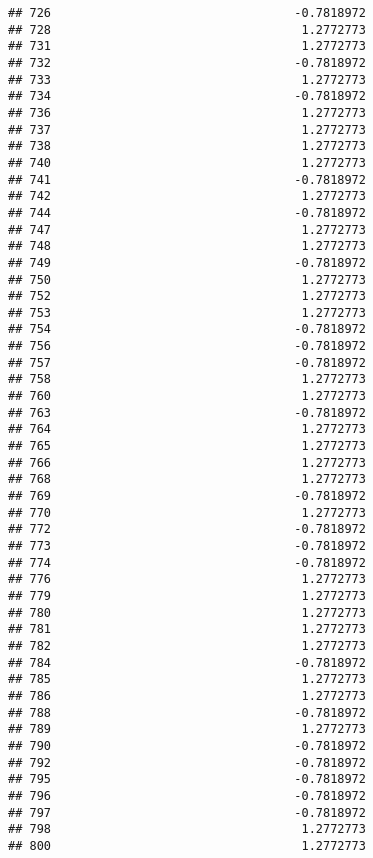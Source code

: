 \documentclass[
]{article}
\begin{document}
\begin{verbatim}
## 726                                  -0.7818972
## 728                                   1.2772773
## 731                                   1.2772773
## 732                                  -0.7818972
## 733                                   1.2772773
## 734                                  -0.7818972
## 736                                   1.2772773
## 737                                   1.2772773
## 738                                   1.2772773
## 740                                   1.2772773
## 741                                  -0.7818972
## 742                                   1.2772773
## 744                                  -0.7818972
## 747                                   1.2772773
## 748                                   1.2772773
## 749                                  -0.7818972
## 750                                   1.2772773
## 752                                   1.2772773
## 753                                   1.2772773
## 754                                  -0.7818972
## 756                                  -0.7818972
## 757                                  -0.7818972
## 758                                   1.2772773
## 760                                   1.2772773
## 763                                  -0.7818972
## 764                                   1.2772773
## 765                                   1.2772773
## 766                                   1.2772773
## 768                                   1.2772773
## 769                                  -0.7818972
## 770                                   1.2772773
## 772                                  -0.7818972
## 773                                  -0.7818972
## 774                                  -0.7818972
## 776                                   1.2772773
## 779                                   1.2772773
## 780                                   1.2772773
## 781                                   1.2772773
## 782                                   1.2772773
## 784                                  -0.7818972
## 785                                   1.2772773
## 786                                   1.2772773
## 788                                  -0.7818972
## 789                                   1.2772773
## 790                                  -0.7818972
## 792                                  -0.7818972
## 795                                  -0.7818972
## 796                                  -0.7818972
## 797                                  -0.7818972
## 798                                   1.2772773
## 800                                   1.2772773

\end{verbatim}
\end{document}

